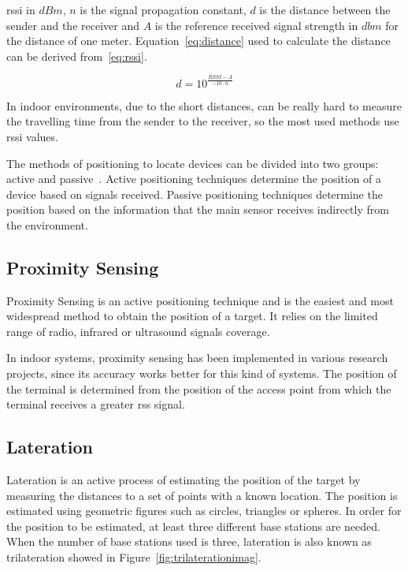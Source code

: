 \gls{rssi} in $dBm$, $n$ is the signal propagation constant, $d$ is the distance between the sender and the receiver and $A$ is the reference received signal strength in $dbm$ for the distance of one meter.
Equation~\ref{eq:distance} used to calculate the distance can be derived from~\ref{eq:rssi}.

\begin{equation}
\label{eq:distance}
d =10^{\frac{RSSI-A}{-10\cdot n}}
\end{equation}

In indoor environments, due to the short distances, can be really hard to measure the travelling time from the sender to the receiver, so the most used methods use \gls{rssi} values.

The methods of positioning to locate devices can be divided into two groups: active and passive~\citep{surveylocation}. 
Active positioning techniques determine the position of a device based on signals received.
Passive positioning techniques determine the position based on the information that the main sensor receives indirectly  from the environment. 


\subsection{Proximity Sensing}
\label{subsection:proximity}
Proximity Sensing is an active positioning technique and is the easiest and most widespread method to obtain the position of a target. It relies on the limited range of radio, infrared or ultrasound signals coverage.

In indoor systems, proximity sensing has been implemented in various research projects, since its accuracy works better for this kind of systems. The position of the terminal is determined from the position of the access point from which the terminal receives a greater \gls{rss} signal.

\subsection{Lateration}
\label{subsection:lateration}
Lateration is an active process of estimating the position of the target by measuring the distances to a set of points with a known location. The position is estimated using geometric figures such as circles, triangles or spheres. In order for the position to be estimated, at least three different base stations are needed. When the number of base stations used is three, lateration is also known as trilateration showed in Figure~\ref{fig:trilaterationimag}.

